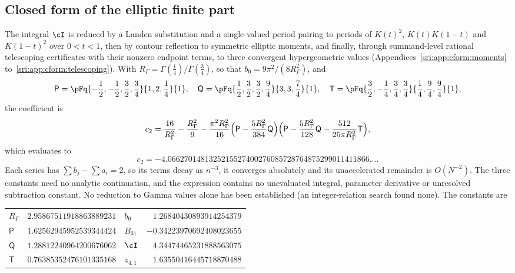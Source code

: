 \subsection{Closed form of the elliptic finite part}\label{sri:sec:closed2}
The integral $\cI$ is reduced by a Landen substitution and a single-valued period pairing to periods of $K(t)^2$,
$K(t)K(1-t)$ and $K(1-t)^2$ over $0<t<1$, then by contour reflection to symmetric elliptic moments, and finally, through summand-level rational telescoping certificates with
their nonzero endpoint terms, to three convergent hypergeometric values (Appendices~\ref{sri:app:cform:moments} to~\ref{sri:app:cform:telescoping}). With $R_\Gamma=\Gamma(\frac14)/\Gamma(\frac34)$,
so that $b_0=9\pi^2/(8R_\Gamma^2)$, and
\begin{equation}
 \mathsf P=\pFq{-\frac12,-\frac12,\frac32,\frac34}{1,2,\frac14}{1},\quad
 \mathsf Q=\pFq{\frac12,\frac32,\frac32,\frac94}{3,3,\frac74}{1},\quad
 \mathsf T=\pFq{\frac32,-\frac14,\frac34,\frac34}{\frac14,\frac94,\frac94}{1},
\end{equation}
the coefficient is
\begin{equation}
 c_2=\frac{16}{R_\Gamma^2}-\frac{R_\Gamma^2}{9}
 -\frac{\pi^2R_\Gamma^2}{16}\Bigl(\mathsf P-\frac{5R_\Gamma^2}{384}\mathsf Q\Bigr)
 \Bigl(\mathsf P-\frac{5R_\Gamma^2}{128}\mathsf Q-\frac{512}{25\pi R_\Gamma^2}\mathsf T\Bigr),
 \label{sri:eq:c2closed}
\end{equation}
which evaluates to
\begin{equation}
 c_2=-4.0662701481325215527400276085728764875299011411866\ldots .
 \label{sri:eq:c2num}
\end{equation}
Each series has $\sum b_j-\sum a_i=2$, so its terms decay as $n^{-3}$, it converges absolutely and its unaccelerated
remainder is $O(N^{-2})$. The three constants need no analytic continuation, and the expression contains no unevaluated
integral, parameter derivative or unresolved subtraction constant. No reduction to
Gamma values alone has been established (an integer-relation search found none). The constants are
\begin{center}\small
\begin{tabular}{@{}lr@{\qquad}lr@{}}
\toprule
$R_\Gamma$ & $2.95867511918863889231$ & $b_0$ & $1.26840430893914254379$\\
$\mathsf P$ & $1.62562945952539344424$ & $B_{31}$ & $-0.34223970692408023655$\\
$\mathsf Q$ & $1.28812240964200676062$ & $\cI$ & $4.34474465231888563075$\\
$\mathsf T$ & $0.76385352476101335168$ & $z_{4,1}$ & $1.63550416445718870488$\\
\bottomrule
\end{tabular}
\end{center}
